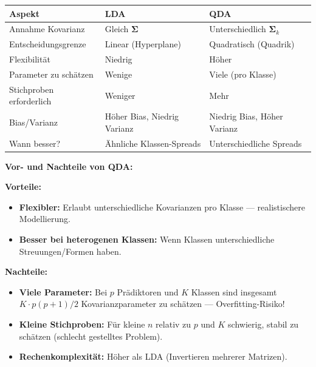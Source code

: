 
\begin{table}[h]
    \centering
    \small
    \begin{tabular}{|l|l|l|}
        \hline
        \textbf{Aspekt} & \textbf{LDA} & \textbf{QDA} \\
        \hline
        Annahme Kovarianz & Gleich $\boldsymbol{\Sigma}$ & Unterschiedlich $\boldsymbol{\Sigma}_k$ \\
        \hline
        Entscheidungsgrenze & Linear (Hyperplane) & Quadratisch (Quadrik) \\
        \hline
        Flexibilität & Niedrig & Höher \\
        \hline
        Parameter zu schätzen & Wenige & Viele (pro Klasse) \\
        \hline
        Stichproben erforderlich & Weniger & Mehr \\
        \hline
        Bias/Varianz & Höher Bias, Niedrig Varianz & Niedrig Bias, Höher Varianz \\
        \hline
        Wann besser? & Ähnliche Klassen-Spreads & Unterschiedliche Spreads \\
        \hline
    \end{tabular}
\end{table}

\textbf{Vor- und Nachteile von QDA:}

\textbf{Vorteile:}
\begin{itemize}[leftmargin=1.5em]
    \item \textbf{Flexibler:} Erlaubt unterschiedliche Kovarianzen pro Klasse — realistischere Modellierung.
    \item \textbf{Besser bei heterogenen Klassen:} Wenn Klassen unterschiedliche Streuungen/Formen haben.
\end{itemize}

\textbf{Nachteile:}
\begin{itemize}[leftmargin=1.5em]
    \item \textbf{Viele Parameter:} Bei $p$ Prädiktoren und $K$ Klassen sind insgesamt $K \cdot p(p+1)/2$ Kovarianzparameter zu schätzen — Overfitting-Risiko!
    \item \textbf{Kleine Stichproben:} Für kleine $n$ relativ zu $p$ und $K$ schwierig, stabil zu schätzen (schlecht gestelltes Problem).
    \item \textbf{Rechenkomplexität:} Höher als LDA (Invertieren mehrerer Matrizen).
\end{itemize}

